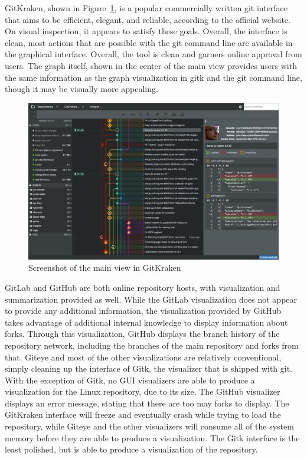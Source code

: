 GitKraken, shown in Figure~\ref{fig:gitkraken_main},  is a popular
commercially written git interface that aims to be efficient, elegant,
and reliable, according to the official website. On visual inspection,
it appears to satisfy these goals. Overall, the interface is clean, most
actions that are possible with the git command line are available in the
graphical interface. Overall, the tool is clean and garners online
approval from users. The graph itself, shown in the center of the main
view provides users with the same information as the graph visualization
in gitk and the git command line, though it may be visually more
appealing.

\begin{figure}[htpb]
  \centering
  \includegraphics[width=0.8\linewidth]{Figures/introduction/gitkraken_main.png}
  \caption{Screenshot of the main view in GitKraken}
  \label{fig:gitkraken_main}
\end{figure}

GitLab and GitHub are both online repository hosts, with
visualization and summarization provided as well. While the GitLab
visualization does not appear to provide any additional information, the
visualization provided by GitHub takes advantage of additional internal
knowledge to display information about forks. Through this
visualization, GitHub displays the branch history of the repository
network, including the branches of the main repository and forks from
that. Giteye and most of the other visualizations are relatively
conventional, simply cleaning up the interface of Gitk, the visualizer
that is shipped with git. With the exception of Gitk, no GUI visualizers
are able to produce a visualization for the Linux repository, due to its
size. The GitHub visualizer displays an error message, stating that
there are too may forks to display. The GitKraken interface will freeze
and eventually crash while trying to load the repository, while Giteye
and the other visualizers will consume all of the system memory before
they are able to produce a visualization. The Gitk interface is the
least polished, but is able to produce a visualization of the
repository.

